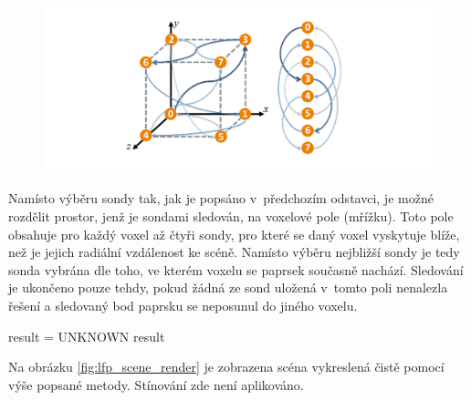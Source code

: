 \begin{figure}[H]
	\centering
	\includegraphics[scale=1]{images/probe_cube.png}
	\captionsetup{justification=centering}
	\label{fig:lfp_cube}
\end{figure}

Namísto výběru sondy tak, jak je popsáno v~předchozím odstavci, je možné rozdělit prostor, jenž je sondami sledován, na voxelové pole (mřížku). Toto pole obsahuje pro každý voxel až čtyři sondy, pro které se daný voxel vyskytuje blíže, než je jejich radiální vzdálenost ke scéně. Namísto výběru nejbližší sondy je tedy sonda vybrána dle toho, ve kterém voxelu se paprsek současně nachází. Sledování je ukončeno pouze tehdy, pokud žádná ze sond uložená v~tomto poli nenalezla řešení a sledovaný bod paprsku se neposunul do jiného voxelu.

\begin{center}
	\begin{czechalgorithm}[H] \label{alg:light_field_trace}
	    result = UNKNOWN\;
	    \KwRet result\;
		\caption{Sledování paprsku skrze light field}
	\end{czechalgorithm}
\end{center}

Na obrázku \ref{fig:lfp_scene_render} je zobrazena scéna vykreslená čistě pomocí výše popsané metody. Stínování zde není aplikováno.

